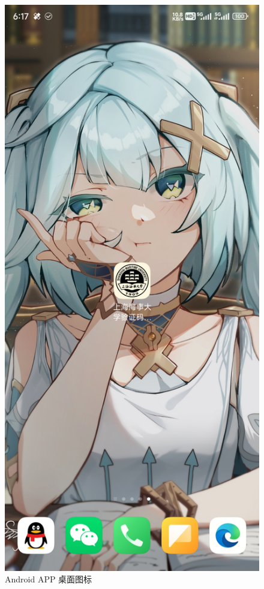 \begin{figure}
	\centering
	\includegraphics[width=0.6\linewidth]{Resources/Picture/android_desktop}
	\caption{Android APP 桌面图标}
	\label{fig:androiddesktop}
\end{figure}

